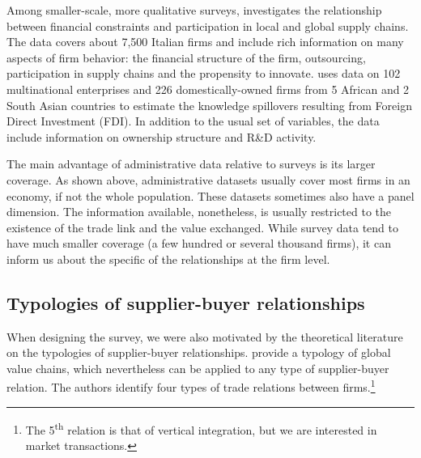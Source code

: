 \documentclass[final, dvipsnames, authoryear,12pt]{elsarticle}
\begin{document}

Among smaller-scale, more qualitative surveys, \cite{minetti2018financial} investigates the relationship between financial constraints and participation in local and global supply chains. The data covers about 7,500 Italian firms and include rich information on many aspects of firm behavior: the financial structure of the firm, outsourcing, participation in supply chains and the propensity to innovate. \cite{newman2018linked}  uses data on 102 multinational enterprises and 226 domestically-owned firms from 5 African and 2 South Asian countries to estimate the knowledge spillovers resulting from Foreign Direct Investment (FDI). In addition to the usual set of variables, the data include information on ownership structure and R\&D activity.

The main advantage of administrative data relative to surveys is its larger coverage. As shown above, administrative datasets usually cover most firms in an economy, if not the whole population. These datasets sometimes also have a panel dimension. The information available, nonetheless, is usually restricted to the existence of the trade link and the value exchanged. While survey data tend to have much smaller coverage (a few hundred or several thousand firms), it can inform us about the specific of the relationships at the firm level.

\subsection{Typologies of supplier-buyer relationships}
\label{sec:typologies}

When designing the survey, we were also motivated by the theoretical literature on the typologies of supplier-buyer relationships.  \cite{gereffi2005governance} provide a typology of global value chains, which nevertheless can be applied to any type of supplier-buyer relation. The authors identify four types of trade relations between firms.\footnote{The 5\textsuperscript{th} relation is that of vertical integration, but we are interested in market transactions.}
\end{document}
